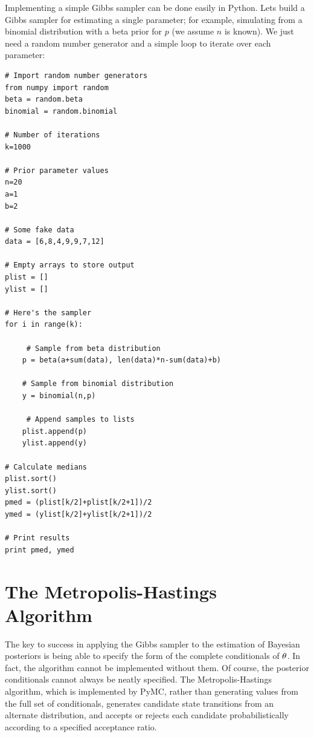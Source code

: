 \documentclass[]{book}
\begin{document}
Implementing a simple Gibbs sampler can be done easily in Python. Lets build a Gibbs sampler for estimating a single parameter; for example, simulating from a binomial distribution with a beta prior for $p$ (we assume $n$ is known). We just need a random number generator and a simple loop to iterate over each parameter:
\vspace{1cm}
\begin{verbatim}
# Import random number generators
from numpy import random
beta = random.beta
binomial = random.binomial

# Number of iterations
k=1000

# Prior parameter values
n=20
a=1
b=2

# Some fake data
data = [6,8,4,9,9,7,12]

# Empty arrays to store output
plist = []
ylist = []

# Here's the sampler
for i in range(k):

     # Sample from beta distribution
    p = beta(a+sum(data), len(data)*n-sum(data)+b)

    # Sample from binomial distribution
    y = binomial(n,p)

     # Append samples to lists
    plist.append(p)
    ylist.append(y)

# Calculate medians
plist.sort()
ylist.sort()
pmed = (plist[k/2]+plist[k/2+1])/2
ymed = (ylist[k/2]+ylist[k/2+1])/2

# Print results
print pmed, ymed
\end{verbatim}
\vspace{1cm}

\section{The Metropolis-Hastings Algorithm}

The key to success in applying the Gibbs sampler to the estimation of Bayesian posteriors is being able to specify the form of the complete conditionals of ${\bf \theta}$. In fact, the algorithm cannot be implemented without them. Of course, the posterior conditionals cannot always be neatly specified. The Metropolis-Hastings algorithm, which is implemented by PyMC, rather than generating values from the full set of conditionals, generates candidate state transitions from an alternate distribution, and accepts or rejects each candidate probabilistically according to a specified acceptance ratio.
\end{document}
